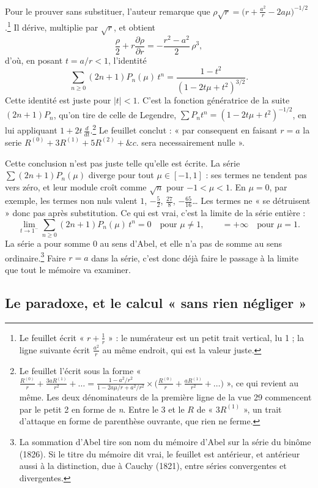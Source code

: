\documentclass[11pt,a4paper]{article}
\begin{document}
Pour le prouver sans substituer, l'auteur remarque que
\(\rho\sqrt r=\bigl(r+\frac{a^2}{r}-2a\mu\bigr)^{-1/2}\).\footnote{Le feuillet
écrit « \(r+\frac1r\) » : le numérateur est un petit trait vertical, lu 1 ; la
ligne suivante écrit \(\frac{a^2}{r}\) au même endroit, qui est la valeur
juste.} Il dérive, multiplie par \(\sqrt r\), et obtient
\[
\frac\rho2+r\frac{\partial\rho}{\partial r}=-\frac{r^2-a^2}{2}\,\rho^3,
\]
d'où, en posant \(t=a/r<1\), l'identité
\[
\sum_{n\ge0}(2n+1)P_n(\mu)\,t^n=\frac{1-t^2}{(1-2t\mu+t^2)^{3/2}} .
\]
Cette identité est juste pour \(|t|<1\). C'est la fonction génératrice de la
suite \((2n+1)P_n\), qu'on tire de celle de Legendre,
\(\sum P_n t^n=(1-2t\mu+t^2)^{-1/2}\), en lui appliquant
\(1+2t\,\frac{d}{dt}\).\footnote{Le feuillet l'écrit sous la forme
« \(\frac{R^{(0)}}{r}+\frac{3aR^{(1)}}{r^2}+\ldots=\frac{1-a^2/r^2}{1-2a\mu/r+a^2/r^2}\times
\bigl(\frac{R^{(0)}}{r}+\frac{aR^{(1)}}{r^2}+\ldots\bigr)\) », ce qui revient au
même. Les deux dénominateurs de la première ligne de la vue 29 commencent par
le petit 2 en forme de \emph{n}. Entre le 3 et le \(R\) de « \(3R^{(1)}\) »,
un trait d'attaque en forme de parenthèse ouvrante, que rien ne ferme.} Le
feuillet conclut : « par consequent en faisant \(r=a\) la serie
\(R^{(0)}+3R^{(1)}+5R^{(2)}+\&c.\) sera necessairement nulle ».

Cette conclusion n'est pas juste telle qu'elle est écrite. La série
\(\sum(2n+1)P_n(\mu)\) diverge pour tout \(\mu\in[-1,1]\) : ses termes ne
tendent pas vers zéro, et leur module croît comme \(\sqrt n\) pour
\(-1<\mu<1\). En \(\mu=0\), par exemple, les termes non nuls valent \(1\),
\(-\tfrac52\), \(\tfrac{27}{8}\), \(-\tfrac{65}{16}\)… Les termes ne « se
détruisent » donc pas après substitution. Ce qui est vrai, c'est la limite de
la série entière :
\[
\lim_{t\to1^-}\sum_{n\ge0}(2n+1)P_n(\mu)\,t^n=0\quad\text{pour }\mu\ne1,
\qquad =+\infty\quad\text{pour }\mu=1 .
\]
La série a pour somme 0 au sens d'Abel, et elle n'a pas de somme au sens
ordinaire.\footnote{La sommation d'Abel tire son nom du mémoire d'Abel sur la
série du binôme (1826). Si le titre du mémoire dit vrai, le feuillet est
antérieur, et antérieur aussi à la distinction, due à Cauchy (1821), entre
séries convergentes et divergentes.} Faire \(r=a\) dans la série, c'est donc
déjà faire le passage à la limite que tout le mémoire va examiner.

\subsection*{Le paradoxe, et le calcul « sans rien négliger »}
\end{document}
